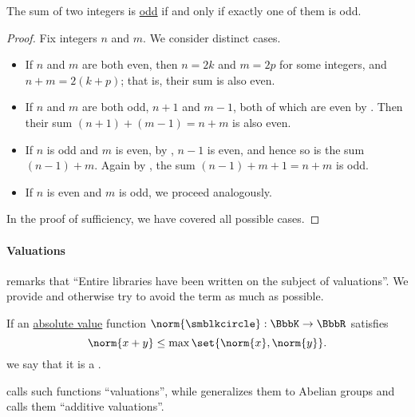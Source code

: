 \begin{proposition}\label{thm:integer_sum_parity}
  The sum of two integers is \hyperref[def:integer_parity]{odd} if and only if exactly one of them is odd.
\end{proposition}
\begin{proof}
  \SufficiencySubProof Fix integers \( n \) and \( m \). We consider distinct cases.

  \begin{itemize}
    \item If \( n \) and \( m \) are both even, then \( n = 2k \) and \( m = 2p \) for some integers, and \( n + m = 2(k + p) \); that is, their sum is also even.

    \item If \( n \) and \( m \) are both odd, \( n + 1 \) and \( m - 1 \), both of which are even by . Then their sum \( (n + 1) + (m - 1) = n + m \) is also even.

    \item If \( n \) is odd and \( m \) is even, by , \( n - 1 \) is even, and hence so is the sum \( (n - 1) + m \). Again by , the sum \( (n - 1) + m + 1 = n + m \) is odd.

    \item If \( n \) is even and \( m \) is odd, we proceed analogously.
  \end{itemize}

  \NecessitySubProof In the proof of sufficiency, we have covered all possible cases.
\end{proof}

\paragraph{Valuations}

 remarks that \enquote{Entire libraries have been written on the subject of valuations}. We provide  and otherwise try to avoid the term as much as possible.

\begin{definition}\label{def:non_archimedean_absolute_value}
  If an \hyperref[def:absolute_value]{absolute value} function \( \norm{\anon}: \BbbK \to \BbbR \) satisfies
  \begin{equation}\label{eq:def:non_archimedean_absolute_value}
    \norm{x + y} \leq \max\set{ \norm{x}, \norm{y} }.
  \end{equation}
  we say that it is a .
\end{definition}
\begin{comments}
  \item {} calls such functions \enquote{valuations}, while \cite[def. 9.4']{Jacobson1989BasicAlgebraII} generalizes them to Abelian groups and calls them \enquote{additive valuations}.
\end{comments}

